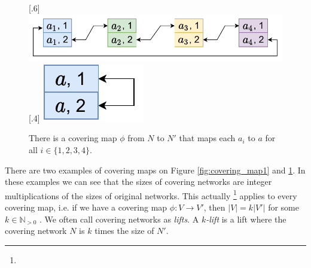 \begin{figure}[H]
    [.6\linewidth] {
    \centering
    \includegraphics[scale=0.55]{diagrams/covering_map_3.pdf}
  }%
    [.4\linewidth] {
    \centering
    \includegraphics[scale=0.55]{diagrams/covering_map_4.pdf}
  }
  \caption{There is a covering map $\phi$ from $N$ to $N'$ that maps each $a_i$ to $a$ for all $i \in \{1, 2, 3, 4\}$.
  }
  \label{fig:covering_map2}
\end{figure}

There are two examples of covering maps on Figure \ref{fig:covering_map1} and \ref{fig:covering_map2}.
In these examples we can see that the sizes of covering networks are integer multiplications of the sizes of original networks.
This actually
\footnote{}
applies to every covering map, i.e. if we have a covering map $\phi\colon V \rightarrow V'$, then $|V| = k|V'|$ for some $k \in \mathbb{N}_{>0}$ \cite{DBLP:journals/dm/GrossT77}.
We often call covering networks as \emph{lifts}.
A \emph{$k$-lift} is a lift where the covering network $N$ is $k$ times the size of $N'$.




